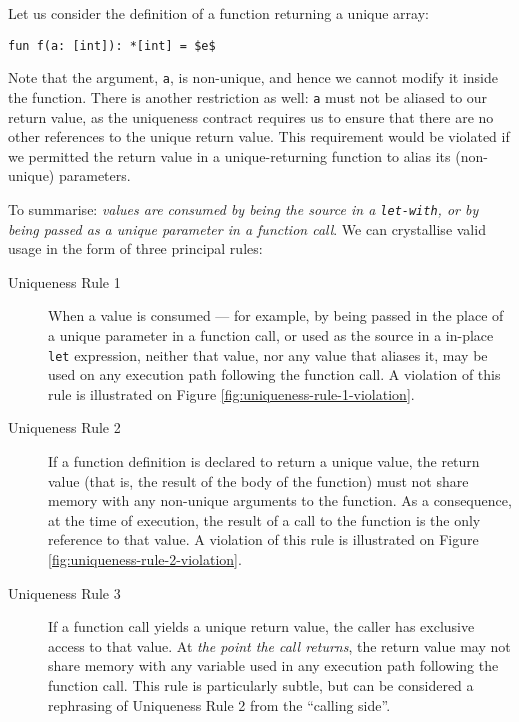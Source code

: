 \documentclass[11pt]{book}
\begin{document}
Let us consider the definition of a function returning a unique array:

\begin{lstlisting}[mathescape=true]
fun f(a: [int]): *[int] = $e$
\end{lstlisting}

Note that the argument, \texttt{a}, is non-unique, and hence we cannot
modify it inside the function.  There is another restriction as well:
\texttt{a} must not be aliased to our return value, as the uniqueness
contract requires us to ensure that there are no other references to
the unique return value.  This requirement would be violated if we
permitted the return value in a unique-returning function to alias its
(non-unique) parameters.

To summarise: \textit{values are consumed by being the source in a
  \texttt{let-with}, or by being passed as a \textit{unique} parameter
  in a function call}.  We can crystallise valid usage in the form of
three principal rules:

\begin{description}
\item[Uniqueness Rule 1] When a value is consumed --- for example, by
  being passed in the place of a unique parameter in a function call,
  or used as the source in a in-place \texttt{let} expression, neither
  that value, nor any value that aliases it, may be used on any
  execution path following the function call.  A violation of this
  rule is illustrated on Figure \ref{fig:uniqueness-rule-1-violation}.

\item[Uniqueness Rule 2] If a function definition is declared to
  return a unique value, the return value (that is, the result of the
  body of the function) must not share memory with any non-unique
  arguments to the function.  As a consequence, at the time of
  execution, the result of a call to the function is the only
  reference to that value.  A violation of this rule is illustrated on
  Figure \ref{fig:uniqueness-rule-2-violation}.

\item[Uniqueness Rule 3] If a function call yields a unique return
  value, the caller has exclusive access to that value.  At
  \textit{the point the call returns}, the return value may not share
  memory with any variable used in any execution path following the
  function call.  This rule is particularly subtle, but can be
  considered a rephrasing of Uniqueness Rule 2 from the ``calling
  side''.
\end{description}
\end{document}
